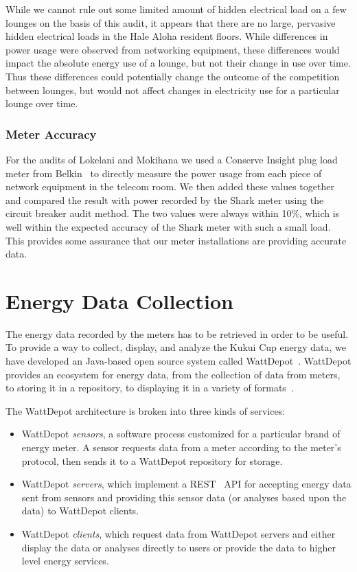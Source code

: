 While we cannot rule out some limited amount of hidden electrical load on a few lounges on the basis of this audit, it appears that there are no large, pervasive hidden electrical loads in the Hale Aloha resident floors. While differences in power usage were observed from networking equipment, these differences would impact the absolute energy use of a lounge, but not their change in use over time. Thus these differences could potentially change the outcome of the competition between lounges, but would not affect changes in electricity use for a particular lounge over time.


\subsubsection{Meter Accuracy}

For the audits of Lokelani and Mokihana we used a Conserve Insight plug load meter from Belkin~\cite{belkin-insight} to directly measure the power usage from each piece of network equipment in the telecom room. We then added these values together and compared the result with power recorded by the Shark meter using the circuit breaker audit method. The two values were always within 10\%, which is well within the expected accuracy of the Shark meter with such a small load. This provides some assurance that our meter installations are providing accurate data.


\section{Energy Data Collection}

The energy data recorded by the meters has to be retrieved in order to be useful. To provide a way to collect, display, and analyze the Kukui Cup energy data, we have developed an Java-based open source system called WattDepot~\cite{csdl2-10-05}. WattDepot provides an ecosystem for energy data, from the collection of data from meters, to storing it in a repository, to displaying it in a variety of formats~\cite{WattDepot}.

The WattDepot architecture is broken into three kinds of services:

\begin{itemize}
\item WattDepot \emph{sensors}, a software process customized for a particular brand of energy meter. A sensor requests data from a meter according to the meter's protocol, then sends it to a WattDepot repository for storage.

\item WattDepot \emph{servers}, which implement a REST~\cite{REST} API for accepting energy data sent from sensors and providing this sensor data (or analyses based upon the data) to WattDepot clients.

\item WattDepot \emph{clients}, which request data from WattDepot servers and either display the data or analyses directly to users or provide the data to higher level energy services.
\end{itemize}

